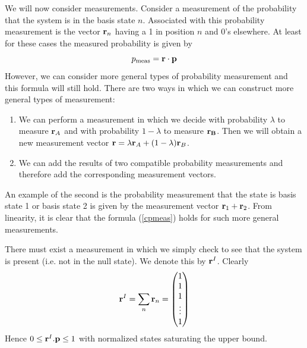 \documentclass[10pt,twocolumn]{article}
\begin{document}
We will now consider measurements.
Consider a measurement of the probability that the system is in the
basis state $n$.  Associated with this probability measurement is the
vector ${\bf r}_n$ having a 1 in position $n$ and 0's elsewhere. At
least for these cases the measured probability is given by
\begin{equation}\label{cpmeas}
p_{\rm meas} = {\bf r}\cdot{\bf p}
\end{equation}
However, we can consider more general types of probability measurement and
this formula will still hold. There are two ways in which we can
construct more general types of measurement:
\begin{enumerate}
\item We can perform a measurement in which we decide with probability
$\lambda$ to measure ${\bf r}_A$ and with probability $1-\lambda$ to
measure ${\bf r_B}$.  Then we will obtain a new measurement vector ${\bf
r}=\lambda {\bf r}_A +(1-\lambda) {\bf r}_B $.
\item We can add the results of two compatible probability measurements
and therefore add the corresponding measurement vectors.
\end{enumerate}
An example of the second is the probability measurement that the state
is basis state 1 or basis state 2 is given by the measurement vector
${\bf r}_1+{\bf r}_2$. From linearity, it is clear that the formula
(\ref{cpmeas}) holds for such more general measurements.

There must exist a measurement in which we simply check to see that the
system is present (i.e. not in the null state).  We denote this by ${\bf
r}^I$.  Clearly
\begin{equation}
{\bf r}^I=\sum_n {\bf r}_n =\left( \begin{matrix} 1 \\ 1 \\ 1 \\ \vdots
\\ 1 \end{matrix} \right)
\end{equation}
Hence $0\leq {\bf r}^I.{\bf p} \leq 1$ with normalized states saturating
the upper bound.
\end{document}
